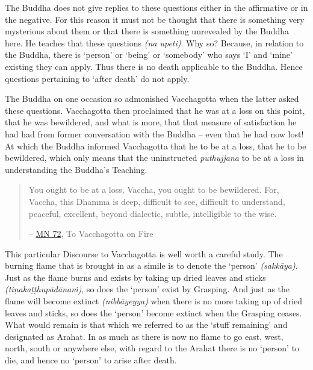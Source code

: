The Buddha does not give replies to these questions either in the affirmative or in the negative. For this reason it must not be thought that there is something very mysterious about them or that there is something unrevealed by the Buddha here. He teaches that these questions  \emph{(na upeti)}. Why so? Because, in relation to the Buddha, there is  `person' or `being' or `somebody' who says `I' and `mine' existing  they can apply. Thus there is no death applicable to the Buddha. Hence questions pertaining to `after death' do not apply.

The Buddha on one occasion so admonished Vacchagotta when the latter asked these questions. Vacchagotta then proclaimed that he was at a loss on this point, that he was bewildered, and what is more, that that measure of satisfaction he had had from former conversation with the Buddha -- even that he had now lost! At which the Buddha informed Vacchagotta that he  to be at a loss, that he  to be bewildered, which only means that the uninstructed \emph{puthujjana}  to be at a loss in understanding the Buddha's Teaching.

\begin{quote}
You ought to be at a loss, Vaccha, you ought to be bewildered. For, Vaccha, this Dhamma is deep, difficult to see, difficult to understand, peaceful, excellent, beyond dialectic, subtle, intelligible to the wise.

 -- \href{https://suttacentral.net/mn72/en/thanissaro}{MN 72}, To Vacchagotta on Fire
\end{quote}

This particular Discourse to Vacchagotta is well worth a careful study. The burning flame that is brought in as a simile is to denote the `person' \emph{(sakkāya)}. Just as the flame burns and exists by taking up dried leaves and sticks \emph{(tiṇakaṭṭhupādānaṁ)}, so does the `person' exist by Grasping. And just as the flame will become extinct \emph{(nibbāyeyya)} when there is no more taking up of dried leaves and sticks, so does the `person' become extinct when the Grasping ceases. What would remain is that which we referred to as the `stuff remaining' and designated as Arahat. In as much as there is now no flame to go east, west, north, south or anywhere else, with regard to the Arahat there is no `person' to die, and hence no `person' to arise after death.

